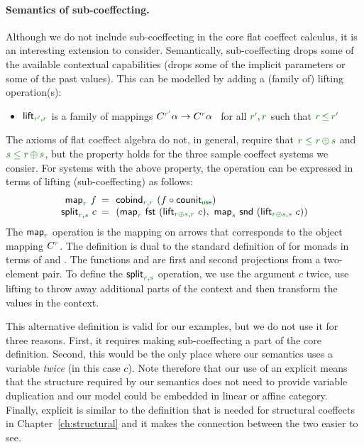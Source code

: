 \paragraph{Semantics of sub-coeffecting.}
Although we do not include sub-coeffecting in the core flat coeffect calculus, it is an interesting
extension to consider. Semantically, sub-coeffecting drops some of the available contextual
capabilities (drops some of the implicit parameters or some of the past values). This can be
modelled by adding a (family of) lifting operation(s):
%
\begin{itemize}
 \item $\ident{lift}_{\cclrd{r'},\cclrd{r}}$ is a family of mappings
   $\ctyp{\cclrd{r'}}{\alpha} \rightarrow \ctyp{\cclrd{r}}{\alpha}$~ for all $\cclrd{r'}, \cclrd{r}$ such that $\cclrd{r}\,\cleq\,\cclrd{r'}$
\end{itemize}
%
The axioms of flat coeffect algebra do not, in general, require that
$\cclrd{r} \;\cleq\; \cclrd{r}\,\cpar\,\cclrd{s}$ and $\cclrd{s} \;\cleq\; \cclrd{r}\,\cpar\,\cclrd{s}$,
but the property holds for the three sample coeffect systems we consier. For systems with
the above property, the  operation can be expressed in terms of lifting
(sub-coeffecting) as follows:
%
\begin{equation*}
\begin{array}{rcl}
\ident{map}_{\cclrd{r}}~f &\narrow{=}& \ident{cobind}_{\cclrd{r}, \cclrd{r}}~(f\circ\ident{counit}_{\cunit}) \\
\ident{split}_{\cclrd{r}, \cclrd{s}}~c &\narrow{=}&
  ( \ident{map}_{\cclrd{r}}~\ident{fst}~(\ident{lift}_{\cclrd{r}\cpar\cclrd{s}, \cclrd{r}}~c),~
    \ident{map}_{\cclrd{s}}~\ident{snd}~(\ident{lift}_{\cclrd{r}\cpar\cclrd{s}, \cclrd{s}}~c) )
\end{array}
\end{equation*}
%
The $\ident{map}_{\cclrd{r}}$ operation is the mapping on arrows that corresponds to the object
mapping $\ctyp{\cclrd{r}}{}$. The definition is dual to the standard definition of 
for monads in terms of  and . The functions  and 
are first and second projections from a two-element pair. To define the
$\ident{split}_{\cclrd{r}, \cclrd{s}}$ operation, we use the argument $c$ twice, use lifting
to throw away additional parts of the context and then transform the values in the
context.

This alternative definition is valid for our examples, but we do not use it for three reasons. First,
it requires making sub-coeffecting a part of the core definition. Second, this would be the only
place where our semantics uses a variable \emph{twice} (in this case $c$). Note therefore that
our use of an explicit  means that the structure required by our semantics does not
need to provide variable duplication and our model could be embedded in linear or affine category.
Finally, explicit  is similar to the definition that is needed for structural coeffects
in Chapter~\ref{ch:structural} and it makes the connection between the two easier to see.


